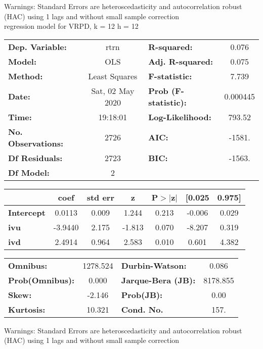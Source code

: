 Warnings: \newline
 [1] Standard Errors are heteroscedasticity and autocorrelation robust (HAC) using 1 lags and without small sample correction\\ 

regression model for VRPD, k = 12 h = 12\begin{center}
\begin{tabular}{lclc}
\toprule
\textbf{Dep. Variable:}    &       rtrn       & \textbf{  R-squared:         } &     0.076   \\
\textbf{Model:}            &       OLS        & \textbf{  Adj. R-squared:    } &     0.075   \\
\textbf{Method:}           &  Least Squares   & \textbf{  F-statistic:       } &     7.739   \\
\textbf{Date:}             & Sat, 02 May 2020 & \textbf{  Prob (F-statistic):} &  0.000445   \\
\textbf{Time:}             &     19:18:01     & \textbf{  Log-Likelihood:    } &    793.52   \\
\textbf{No. Observations:} &        2726      & \textbf{  AIC:               } &    -1581.   \\
\textbf{Df Residuals:}     &        2723      & \textbf{  BIC:               } &    -1563.   \\
\textbf{Df Model:}         &           2      & \textbf{                     } &             \\
\bottomrule
\end{tabular}
\begin{tabular}{lcccccc}
                   & \textbf{coef} & \textbf{std err} & \textbf{z} & \textbf{P$> |$z$|$} & \textbf{[0.025} & \textbf{0.975]}  \\
\midrule
\textbf{Intercept} &       0.0113  &        0.009     &     1.244  &         0.213        &       -0.006    &        0.029     \\
\textbf{ivu}       &      -3.9440  &        2.175     &    -1.813  &         0.070        &       -8.207    &        0.319     \\
\textbf{ivd}       &       2.4914  &        0.964     &     2.583  &         0.010        &        0.601    &        4.382     \\
\bottomrule
\end{tabular}
\begin{tabular}{lclc}
\textbf{Omnibus:}       & 1278.524 & \textbf{  Durbin-Watson:     } &    0.086  \\
\textbf{Prob(Omnibus):} &   0.000  & \textbf{  Jarque-Bera (JB):  } & 8178.855  \\
\textbf{Skew:}          &  -2.146  & \textbf{  Prob(JB):          } &     0.00  \\
\textbf{Kurtosis:}      &  10.321  & \textbf{  Cond. No.          } &     157.  \\
\bottomrule
\end{tabular}
\end{center}

Warnings: \newline
 [1] Standard Errors are heteroscedasticity and autocorrelation robust (HAC) using 1 lags and without small sample correction\\ 

